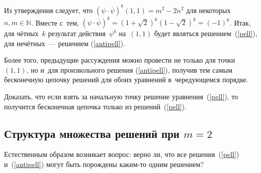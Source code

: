 \documentclass{article}
\begin{document}
Из утверждения следует, что $(\psi \cdot \overline{\psi})^k(1, 1) = m^2 - 2n^2$
для некоторых $n, m \in \mathbb{N}$. Вместе с~тем,
$(\psi \cdot \overline{\psi})^k = (1 + \sqrt{2})^k (1 - \sqrt{2})^k = (-1)^k$.
Итак, для чётных~$k$ результат действия~$\psi^k$ на~$(1, 1)$ будет являться
решением~(\ref{pell}), для нечётных~--- решением (\ref{antipell}).

Более того, предыдущие рассуждения можно провести не только для точки~$(1, 1)$,
но и~для произвольного решения (\ref{antipell}), получив тем самым бесконечную
цепочку решений для обоих уравнений в~чередующемся порядке.

\begin{exercise}
  Доказать, что если взять за начальную точку решение уравнения~(\ref{pell}),
  то получится бесконечная цепочка только из решений~(\ref{pell}).
\end{exercise}

\subsection{Структура множества решений при $m = 2$}

Естественным образом возникает вопрос: верно ли, что все решения~(\ref{pell})
и~(\ref{antipell}) могут быть порождены каким-то одним решением?
\end{document}
